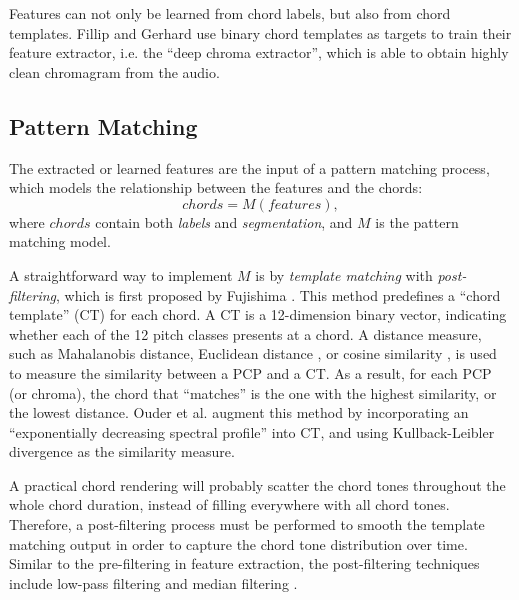 Features can not only be learned from chord labels, but also from chord templates. Fillip and Gerhard \cite{Korzeniowski2016feature} use binary chord templates as targets to train their feature extractor, i.e. the ``deep chroma extractor'', which is able to obtain highly clean chromagram from the audio.



\subsection{Pattern Matching} \label{sec:2-pm}
The extracted or learned features are the input of a pattern matching process, which models the relationship between the features and the chords:
\begin{equation}
\mathit{chords = M(features)},
\end{equation}
where $chords$ contain both {\it labels} and {\it segmentation}, and $M$ is the pattern matching model.

A straightforward way to implement $M$ is by {\it template matching} with \textit{post-filtering}, which is first proposed by Fujishima \cite{fujishima1999realtime}. This method predefines a ``chord template'' (CT) for each chord. A CT is a 12-dimension binary vector, indicating whether each of the 12 pitch classes presents at a chord. A distance measure, such as Mahalanobis distance\cite{reinhard2008enhancing}, Euclidean distance \cite{zenz2007automatic}, or cosine similarity \cite{harte2005automatic}, is used to measure the similarity between a PCP and a CT. As a result, for each PCP (or chroma), the chord that ``matches'' is the one with the highest similarity, or the lowest distance. Ouder et al. \cite{oudre2009template} augment this method by incorporating an ``exponentially decreasing spectral profile'' \cite{gomez2006tonal_a} into CT, and using Kullback-Leibler divergence \cite{kullback1951information} as the similarity measure.

A practical chord rendering will probably scatter the chord tones throughout the whole chord duration, instead of filling everywhere with all chord tones. Therefore, a post-filtering process must be performed to smooth the template matching output in order to capture the chord tone distribution over time. Similar to the pre-filtering \cite{cho2014improved} in feature extraction, the post-filtering techniques include low-pass filtering \cite{oudre2009template} and median filtering \cite{harte2005automatic,humphrey2012rethinking}.%

